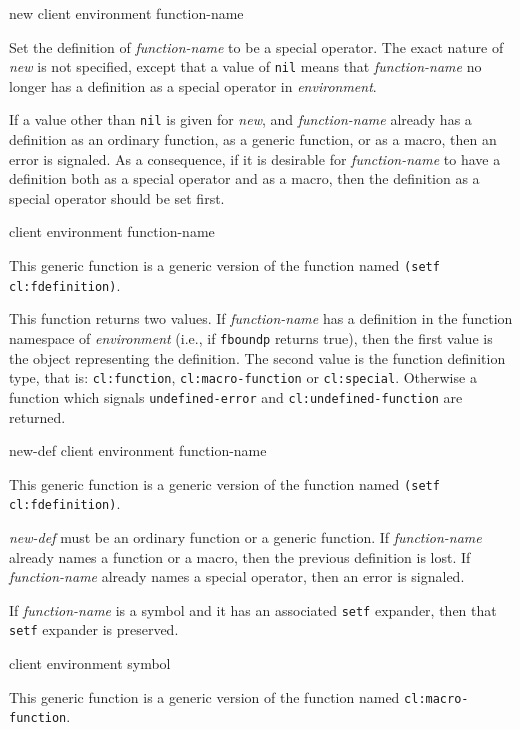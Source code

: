  {new client environment function-name}

Set the definition of \textit{function-name} to be a special operator.
The exact nature of \textit{new} is not specified, except that a
value of \texttt{nil} means that \textit{function-name} no longer has
a definition as a special operator in \textit{environment}.

If a value other than \texttt{nil} is given for \textit{new}, and
\textit{function-name} already has a definition as an ordinary
function, as a generic function, or as a macro, then an error is
signaled.  As a consequence, if it is desirable for
\textit{function-name} to have a definition both as a special operator
and as a macro, then the definition as a special operator should be
set first.

 {client environment function-name}

This generic function is a generic version of the \commonlisp{}
function named \texttt{(setf cl:fdefinition)}.

This function returns two values. If \textit{function-name} has a definition
in the function namespace of \textit{environment} (i.e., if \texttt{fboundp}
returns true), then the first value is the object representing the
definition. The second value is the function definition type, that is:
\texttt{cl:function}, \texttt{cl:macro-function} or
\texttt{cl:special}. Otherwise a function which signals
\texttt{undefined-error} and \texttt{cl:undefined-function} are returned.

 {new-def client environment function-name}

This generic function is a generic version of the \commonlisp{}
function named \texttt{(setf cl:fdefinition)}.

\textit{new-def} must be an ordinary function or a generic function.
If \textit{function-name} already names a function or a macro, then
the previous definition is lost.  If \textit{function-name} already
names a special operator, then an error is signaled.

If \textit{function-name} is a symbol and it has an associated \texttt{setf}
expander, then that \texttt{setf} expander is preserved.

 {client environment symbol}

This generic function is a generic version of the \commonlisp{}
function named \texttt{cl:macro-function}.

